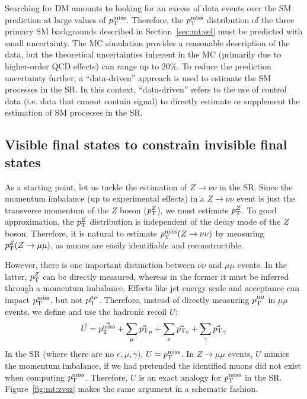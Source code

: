 Searching for DM amounts to looking for an excess of data events over the SM prediction at large values of $p_\mathrm{T}^\mathrm{miss}$.
Therefore, the $p_\mathrm{T}^\mathrm{miss}$ distribution of the three primary SM backgrounds described in Section~\ref{sec:mt:sel} must be predicted with small uncertainty.
The MC simulation provides a reasonable description of the data, but the theoretical uncertainties inherent in the MC (primarily due to higher-order QCD effects) can range up to $20\%$.
To reduce the prediction uncertainty further, a ``data-driven'' approach is used to estimate the SM processes in the SR.
In this context, ``data-driven'' refers to the use of control data (i.e. data that cannot contain signal) to directly estimate or supplement the estimation of SM processes in the SR.

\subsection{Visible final states to constrain invisible final states}

As a starting point, let us tackle the estimation of $Z\rightarrow\nu\nu$ in the SR.
Since the momentum imbalance (up to experimental effects) in a $Z\rightarrow\nu\nu$ event is just the transverse momentum of the $Z$ boson ($p_\mathrm{T}^Z$), we must estimate $p_\mathrm{T}^Z$.
To good approximation, the $p_\mathrm{T}^Z$ distribution is independent of the decay mode of the $Z$ boson.
Therefore, it is natural to estimate $p_\mathrm{T}^\mathrm{miss}(Z\rightarrow\nu\nu)$ by measuring $p_\mathrm{T}^Z(Z\rightarrow\mu\mu)$, as muons are easily identifiable and reconstructible. 

However, there is one important distinction between $\nu\nu$ and $\mu\mu$ events.
In the latter, $p_\mathrm{T}^Z$ can be directly measured, whereas in the former it must be inferred through a momentum imbalance.
Effects like jet energy scale and acceptance can impact $p_\mathrm{T}^\mathrm{miss}$, but not $p_\mathrm{T}^{\mu\mu}$. 
Therefore, instead of directly measuring $p_\mathrm{T}^{\mu\mu}$ in $\mu\mu$ events, we define and use the hadronic recoil $U$:
\begin{equation}
    \vec{U} = \vec{p_\mathrm{T}^\mathrm{miss}} + \sum_{\mu} \vec{p_\mathrm{T}}_\mu + \sum_{e} \vec{p_\mathrm{T}}_e + \sum_\gamma \vec{p_\mathrm{T}}_\gamma
\end{equation}
In the SR (where there are no $e,\mu,\gamma$), $U = p_\mathrm{T}^\mathrm{miss}$.
In $Z\rightarrow\mu\mu$ events, $U$ mimics the momentum imbalance, if we had pretended the identified muons did not exist when computing $p_\mathrm{T}^\mathrm{miss}$. 
Therefore, $U$ is an exact analogy for $p_\mathrm{T}^\mathrm{miss}$ in the SR.
Figure~\ref{fig:mt:zvsz} makes the same argument in a schematic fashion. 

